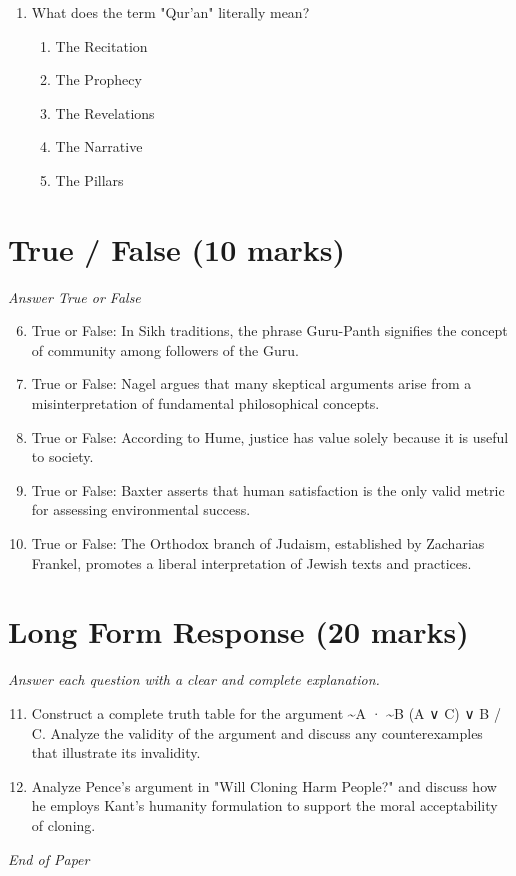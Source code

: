\documentclass[12pt]{article}
\begin{document}
\begin{enumerate}[label=\arabic*.]
\begin{enumerate}[label=(\alph*)]
    \item False sign
    \item False cause
    \item Hasty Generalization
\end{enumerate}
\item What does the term "Qur'an" literally mean?
\begin{enumerate}[label=(\alph*)]
    \item The Recitation
    \item The Prophecy
    \item The Revelations
    \item The Narrative
    \item The Pillars
\end{enumerate}
\end{enumerate}

\section*{True / False (10 marks)}
\textit{Answer True or False}
\begin{enumerate}[label=\arabic*.]
\setcounter{enumi}{5}
\item True or False: In Sikh traditions, the phrase Guru-Panth signifies the concept of community among followers of the Guru.
\item True or False: Nagel argues that many skeptical arguments arise from a misinterpretation of fundamental philosophical concepts.
\item True or False: According to Hume, justice has value solely because it is useful to society.
\item True or False: Baxter asserts that human satisfaction is the only valid metric for assessing environmental success.
\item True or False: The Orthodox branch of Judaism, established by Zacharias Frankel, promotes a liberal interpretation of Jewish texts and practices.
\end{enumerate}

\section*{Long Form Response (20 marks)}
\textit{Answer each question with a clear and complete explanation.}
\begin{enumerate}[label=\arabic*.]
\setcounter{enumi}{10}
\item Construct a complete truth table for the argument \textasciitilde{}A · \textasciitilde{}B (A ∨ C) ∨ B / C. Analyze the validity of the argument and discuss any counterexamples that illustrate its invalidity.
\item Analyze Pence's argument in "Will Cloning Harm People?" and discuss how he employs Kant's humanity formulation to support the moral acceptability of cloning.
\end{enumerate}

\vfill
\noindent\textit{End of Paper}
\end{document}
